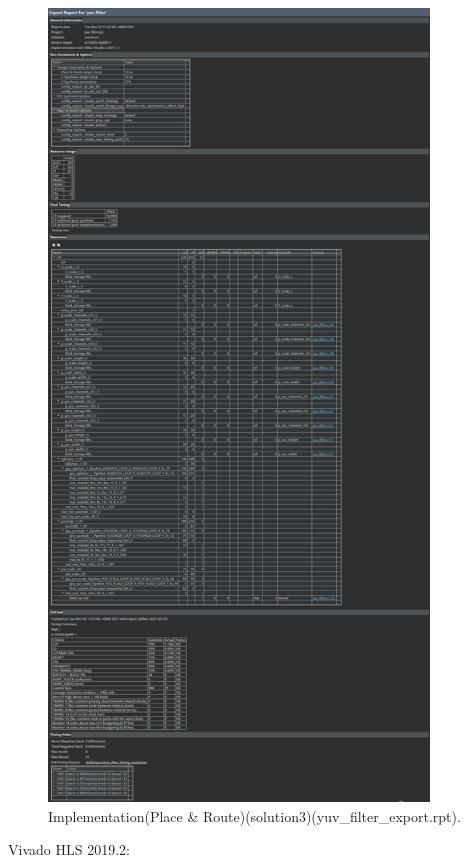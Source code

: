 \documentclass[a4paper]{article}
\begin{document}
\begin{figure}[H]
    \centering
    \includegraphics[width=0.9\textwidth]{9.png}
    \caption{Implementation(Place \& Route)(solution3)(yuv\_filter\_export.rpt).}
\end{figure}
Vivado HLS 2019.2:
\end{document}
